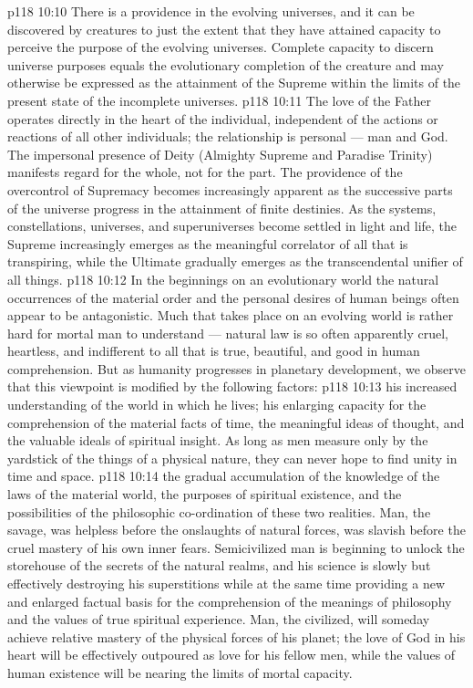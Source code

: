 \vs p118 10:10 There is a providence in the evolving universes, and it can be discovered by creatures to just the extent that they have attained capacity to perceive the purpose of the evolving universes. Complete capacity to discern universe purposes equals the evolutionary completion of the creature and may otherwise be expressed as the attainment of the Supreme within the limits of the present state of the incomplete universes.
\vs p118 10:11 The love of the Father operates directly in the heart of the individual, independent of the actions or reactions of all other individuals; the relationship is personal --- man and God. The impersonal presence of Deity (Almighty Supreme and Paradise Trinity) manifests regard for the whole, not for the part. The providence of the overcontrol of Supremacy becomes increasingly apparent as the successive parts of the universe progress in the attainment of finite destinies. As the systems, constellations, universes, and superuniverses become settled in light and life, the Supreme increasingly emerges as the meaningful correlator of all that is transpiring, while the Ultimate gradually emerges as the transcendental unifier of all things.
\vs p118 10:12 \pc In the beginnings on an evolutionary world the natural occurrences of the material order and the personal desires of human beings often appear to be antagonistic. Much that takes place on an evolving world is rather hard for mortal man to understand --- natural law is so often apparently cruel, heartless, and indifferent to all that is true, beautiful, and good in human comprehension. But as humanity progresses in planetary development, we observe that this viewpoint is modified by the following factors:
\vs p118 10:13 \bibnobreakspace {} his increased understanding of the world in which he lives; his enlarging capacity for the comprehension of the material facts of time, the meaningful ideas of thought, and the valuable ideals of spiritual insight. As long as men measure only by the yardstick of the things of a physical nature, they can never hope to find unity in time and space.
\vs p118 10:14 \pc {}\bibnobreakspace {} the gradual accumulation of the knowledge of the laws of the material world, the purposes of spiritual existence, and the possibilities of the philosophic co\hyp{}ordination of these two realities. Man, the savage, was helpless before the onslaughts of natural forces, was slavish before the cruel mastery of his own inner fears. Semicivilized man is beginning to unlock the storehouse of the secrets of the natural realms, and his science is slowly but effectively destroying his superstitions while at the same time providing a new and enlarged factual basis for the comprehension of the meanings of philosophy and the values of true spiritual experience. Man, the civilized, will someday achieve relative mastery of the physical forces of his planet; the love of God in his heart will be effectively outpoured as love for his fellow men, while the values of human existence will be nearing the limits of mortal capacity.
